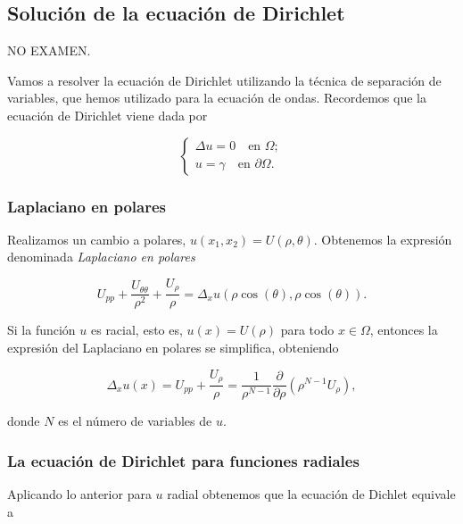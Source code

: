 \documentclass{article}
\begin{document}
\subsection{Solución de la ecuación de Dirichlet}

NO EXAMEN.

Vamos a resolver la ecuación de Dirichlet utilizando la técnica de separación de variables, que
hemos utilizado para la ecuación de ondas. Recordemos que la ecuación de Dirichlet viene dada por

\begin{equation}
  \label{eq:dirichlet}
  \begin{cases}
    \Delta u = 0 \quad \text{en } \Omega; \\
    u = \gamma \quad \text{en } \partial \Omega.
  \end{cases}
\end{equation}

\subsubsection{Laplaciano en polares}

Realizamos un cambio a polares, $u(x_1,x_2) = U(\rho, \theta)$. Obtenemos la expresión denominada
\emph{Laplaciano en polares}

\begin{equation}
  \label{eq:laplaciano:polares}
  U_{pp} + \frac{U_{\theta\theta}}{\rho^2} + \frac{U_{\rho}}{\rho} = \Delta_x u(\rho \cos(\theta), \rho \cos(\theta)).
\end{equation}

Si la función $u$ es racial, esto es, $u(x) = U(\rho)$ para todo $x \in \Omega$, entonces la
expresión del Laplaciano en polares se simplifica, obteniendo

\begin{equation}
  \label{eq:laplaciano:radial}
  \Delta_x u(x) = U_{pp} + \frac{U_{\rho}}{\rho} = \frac{1}{\rho^{N-1}} \frac{\partial}{\partial \rho}(\rho^{N-1} U_{\rho}),
\end{equation}

donde $N$ es el número de variables de $u$.

\subsubsection{La ecuación de Dirichlet para funciones radiales}

Aplicando lo anterior para $u$ radial obtenemos que la ecuación de Dichlet equivale a
\end{document}
